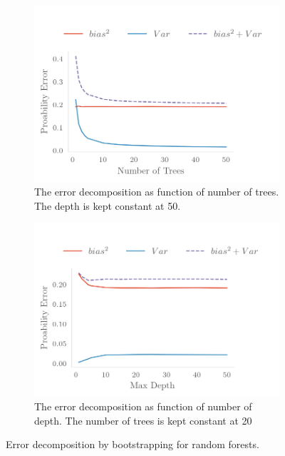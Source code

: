 \begin{figure}[H]
    \begin{subfigure}
        \centering
        \includegraphics{Figures/randforest_biasvar.png}
        \caption{The error decomposition
        as function of number of trees. The depth is kept constant
        at 50.}
    \end{subfigure}
    \begin{subfigure}
        \centering
        \includegraphics{Figures/randforest_depth_biasvar.png}
        \caption{The error decomposition
        as function of number of depth. The number of trees is kept
        constant at 20}
    \end{subfigure}
    \caption{Error decomposition by bootstrapping for random forests.}
    \label{fig:randfor_err}
\end{figure}

